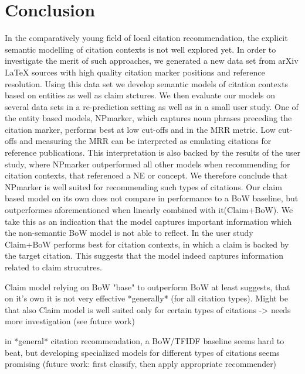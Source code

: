 \chapter{Conclusion}\label{chap:conclusion}
In the comparatively young field of local citation recommendation, the explicit semantic modelling of citation contexts is not well explored yet. In order to investigate the merit of such approaches, we generated a new data set from arXiv \LaTeX{} sources with high quality citation marker positions and reference resolution. Using this data set we develop semantic models of citation contexts based on entities as well as claim stctures. We then evaluate our models on several data sets in a re-prediction setting as well as in a small user study. One of the entity based models, NPmarker, which captures noun phrases preceding the citation marker, performs best at low cut-offs and in the MRR metric. Low cut-offs and measuring the MRR can be interpreted as emulating citations for reference publications. This interpretation is also backed by the results of the user study, where NPmarker outperformed all other models when recommending for citation contexts, that referenced a NE or concept. We therefore conclude that NPmarker is well suited for recommending such types of citations. Our claim based model on its own does not compare in performance to a BoW baseline, but outperformes aforementioned when linearly combined with it(Claim+BoW). We take this as an indication that the model captures important information which the non-semantic BoW model is not able to reflect. In the user study Claim+BoW performs best for citation contexts, in which a claim is backed by the target citation. This suggests that the model indeed captures information related to claim strucutres.

Claim model relying on BoW "base" to outperform BoW at least suggests, that on it's own it is not very effective *generally* (for all citation types). Might be that also Claim model is well suited only for certain types of citations -> needs more investigation (see future work)

in *general* citation recommendation, a BoW/TFIDF baseline seems hard to beat, but developing specialized models for different types of citations seems promising (future work: first classify, then apply appropriate recommender)
